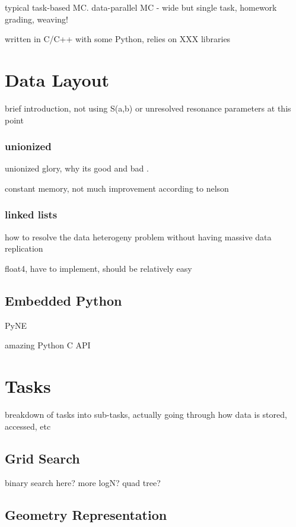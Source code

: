 typical task-based MC.  data-parallel MC - wide but single task, homework grading, weaving!

written in C/C++ with some Python, relies on XXX libraries


\section{Data Layout}

brief introduction, not using S(a,b) or unresolved resonance parameters at this point

\subsubsection{unionized}

unionized glory, why its good and bad \cite{jaakko}.

constant memory, not much improvement according to nelson

\subsubsection{linked lists}

how to resolve the data heterogeny problem without having massive data replication

float4, have to implement, should be relatively easy

\subsection{Embedded Python}

PyNE

amazing Python C API



\section{Tasks}

breakdown of tasks into sub-tasks, actually going through how data is stored, accessed, etc

\subsection{Grid Search}

binary search here? more logN?  quad tree?

\subsection{Geometry Representation}


